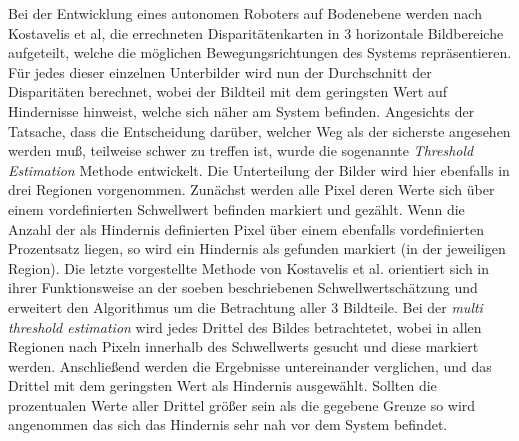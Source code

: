 \noindent
Bei der Entwicklung eines autonomen Roboters auf Bodenebene werden nach Kostavelis et al, \cite{kostavelis2010comparative} die errechneten Disparitätenkarten in 3 horizontale Bildbereiche aufgeteilt, welche die möglichen Bewegungsrichtungen des Systems repräsentieren. Für jedes dieser einzelnen Unterbilder wird nun der Durchschnitt der Disparitäten berechnet, wobei der Bildteil mit dem geringsten Wert auf Hindernisse hinweist, welche sich näher am System befinden. Angesichts der Tatsache, dass die Entscheidung darüber, welcher Weg als der sicherste angesehen werden muß, teilweise schwer zu treffen ist, wurde die sogenannte \emph{Threshold Estimation} Methode entwickelt.
Die Unterteilung der Bilder wird hier ebenfalls in drei Regionen vorgenommen. Zunächst werden alle Pixel deren Werte sich über einem vordefinierten Schwellwert befinden markiert und gezählt. 
Wenn die Anzahl der als Hindernis definierten Pixel über einem ebenfalls vordefinierten Prozentsatz liegen, so wird ein Hindernis als gefunden markiert (in der jeweiligen Region). Die letzte vorgestellte Methode von Kostavelis et al. orientiert sich in ihrer Funktionsweise an der soeben beschriebenen Schwellwertschätzung und erweitert den Algorithmus um die Betrachtung aller 3 Bildteile.
Bei der \emph{multi threshold estimation} wird jedes Drittel des Bildes betrachtetet, wobei in allen Regionen nach Pixeln innerhalb des Schwellwerts gesucht und diese markiert werden. Anschließend werden die Ergebnisse untereinander verglichen, und das Drittel mit dem geringsten Wert als Hindernis ausgewählt. Sollten die prozentualen Werte aller Drittel größer sein als die gegebene Grenze so wird angenommen das sich das Hindernis sehr nah vor dem System befindet.\\

